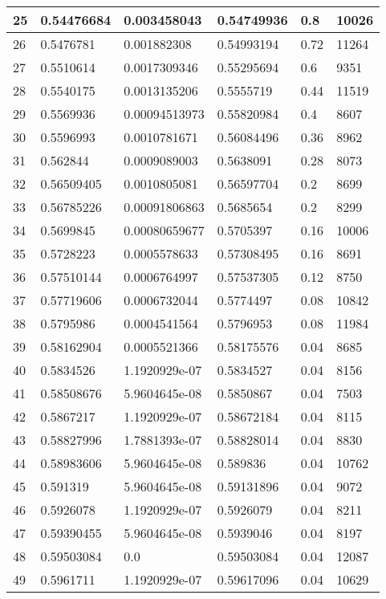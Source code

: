 \begin{longtable}{|l|l|l|l|l|l|}
25 & 0.54476684 & 0.003458043 & 0.54749936 & 0.8 & 10026 \\ \hline 
26 & 0.5476781 & 0.001882308 & 0.54993194 & 0.72 & 11264 \\ \hline 
27 & 0.5510614 & 0.0017309346 & 0.55295694 & 0.6 & 9351 \\ \hline 
28 & 0.5540175 & 0.0013135206 & 0.5555719 & 0.44 & 11519 \\ \hline 
29 & 0.5569936 & 0.00094513973 & 0.55820984 & 0.4 & 8607 \\ \hline 
30 & 0.5596993 & 0.0010781671 & 0.56084496 & 0.36 & 8962 \\ \hline 
31 & 0.562844 & 0.0009089003 & 0.5638091 & 0.28 & 8073 \\ \hline 
32 & 0.56509405 & 0.0010805081 & 0.56597704 & 0.2 & 8699 \\ \hline 
33 & 0.56785226 & 0.00091806863 & 0.5685654 & 0.2 & 8299 \\ \hline 
34 & 0.5699845 & 0.00080659677 & 0.5705397 & 0.16 & 10006 \\ \hline 
35 & 0.5728223 & 0.0005578633 & 0.57308495 & 0.16 & 8691 \\ \hline 
36 & 0.57510144 & 0.0006764997 & 0.57537305 & 0.12 & 8750 \\ \hline 
37 & 0.57719606 & 0.0006732044 & 0.5774497 & 0.08 & 10842 \\ \hline 
38 & 0.5795986 & 0.0004541564 & 0.5796953 & 0.08 & 11984 \\ \hline 
39 & 0.58162904 & 0.0005521366 & 0.58175576 & 0.04 & 8685 \\ \hline 
40 & 0.5834526 & 1.1920929e-07 & 0.5834527 & 0.04 & 8156 \\ \hline 
41 & 0.58508676 & 5.9604645e-08 & 0.5850867 & 0.04 & 7503 \\ \hline 
42 & 0.5867217 & 1.1920929e-07 & 0.58672184 & 0.04 & 8115 \\ \hline 
43 & 0.58827996 & 1.7881393e-07 & 0.58828014 & 0.04 & 8830 \\ \hline 
44 & 0.58983606 & 5.9604645e-08 & 0.589836 & 0.04 & 10762 \\ \hline 
45 & 0.591319 & 5.9604645e-08 & 0.59131896 & 0.04 & 9072 \\ \hline 
46 & 0.5926078 & 1.1920929e-07 & 0.5926079 & 0.04 & 8211 \\ \hline 
47 & 0.59390455 & 5.9604645e-08 & 0.5939046 & 0.04 & 8197 \\ \hline 
48 & 0.59503084 & 0.0 & 0.59503084 & 0.04 & 12087 \\ \hline 
49 & 0.5961711 & 1.1920929e-07 & 0.59617096 & 0.04 & 10629 \\ \hline 

\end{longtable}
